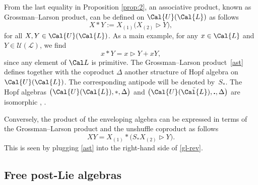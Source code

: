 \documentclass[pdftex]{sigma}
\numberwithin{equation}{section}
\begin{document}
From the last equality in Proposition \ref{prop:2}, an associative product, known as Grossman--Larson product, can be defined on $\Cal{U}(\Cal{L})$ as follows
\begin{equation}\label{ast}
X \ast Y := X_{(1)}\big(X_{(2)} \rhd Y\big),
\end{equation}
for all $X, Y \in \Cal{U}(\Cal{L})$. As a main example, for any $x\in \Cal{L}$ and $Y\in\mathcal U(\mathcal L)$, we find
\begin{equation}\label{GL-simple}
x \ast Y = x \rhd Y + xY,
\end{equation}
since any element of $\Cal L$ is primitive. The Grossman--Larson product~\eqref{ast} defines together with the coproduct $\Delta$ another structure of Hopf algebra on $\Cal{U}(\Cal{L})$. The corresponding antipode will be denoted by~$S_*$. The Hopf algebras $\big(\Cal{U}(\Cal{L}), \ast, \Delta \big)$ and $\big(\Cal{U}(\tilde{\Cal{L}}), \textbf{.}, \Delta \big)$ are isomorphic \cite[Section~3]{KLM06}, \cite[Section~2]{OG2008}.
\begin{Remark}
Conversely, the product of the enveloping algebra can be expressed in terms of the Grossman--Larson product and the unshuffle coproduct as follows
\begin{equation}\label{gl-rev}
XY=X_{(1)}*\big(S_*X_{(2)}\rhd Y\big).
\end{equation}
This is seen by plugging \eqref{ast} into the right-hand side of \eqref{gl-rev}.
\end{Remark}

\subsection{Free post-Lie algebras}
\end{document}
